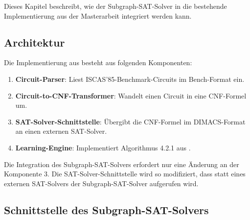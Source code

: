 ﻿\documentclass[a4paper,12pt]{article}
\theoremstyle{definition}
\begin{document}
Dieses Kapitel beschreibt, wie der Subgraph-SAT-Solver in die bestehende Implementierung aus der Masterarbeit integriert werden kann.

\subsection{Architektur}

Die Implementierung aus \cite{Epp13} besteht aus folgenden Komponenten:
\begin{enumerate}
    \item \textbf{Circuit-Parser}: Liest ISCAS'85-Benchmark-Circuits im Bench-Format ein.
    \item \textbf{Circuit-to-CNF-Transformer}: Wandelt einen Circuit in eine CNF-Formel um.
    \item \textbf{SAT-Solver-Schnittstelle}: Übergibt die CNF-Formel im DIMACS-Format an einen externen SAT-Solver.
    \item \textbf{Learning-Engine}: Implementiert Algorithmus 4.2.1 aus \cite{Epp13}.
\end{enumerate}

Die Integration des Subgraph-SAT-Solvers erfordert nur eine Änderung an der Komponente 3. Die SAT-Solver-Schnittstelle wird so modifiziert, dass statt eines externen SAT-Solvers der Subgraph-SAT-Solver aufgerufen wird.

\subsection{Schnittstelle des Subgraph-SAT-Solvers}
\end{document}
